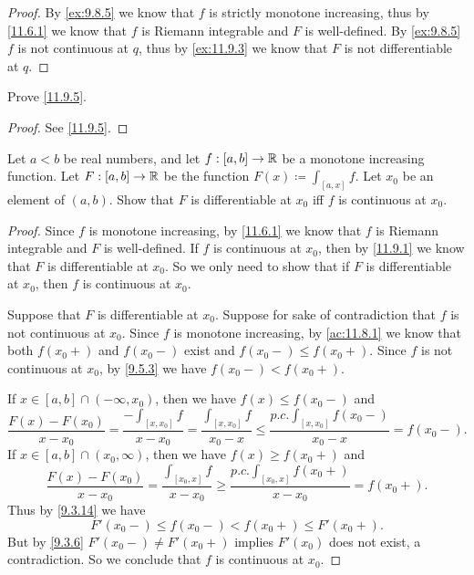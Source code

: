 \begin{proof}
  By \cref{ex:9.8.5} we know that \(f\) is strictly monotone increasing, thus by \cref{11.6.1} we know that \(f\) is Riemann integrable and \(F\) is well-defined.
  By \cref{ex:9.8.5} \(f\) is not continuous at \(q\), thus by \cref{ex:11.9.3} we know that \(F\) is not differentiable at \(q\).
\end{proof}

\begin{ex}\label{ex:11.9.2}
  Prove \cref{11.9.5}.
\end{ex}

\begin{proof}
  See \cref{11.9.5}.
\end{proof}

\begin{ex}\label{ex:11.9.3}
  Let \(a < b\) be real numbers, and let \(f : [a, b] \to \mathbb{R}\) be a monotone increasing function.
  Let \(F : [a, b] \to \mathbb{R}\) be the function \(F(x) \coloneqq \int_{[a, x]} f\).
  Let \(x_0\) be an element of \((a, b)\).
  Show that \(F\) is differentiable at \(x_0\) iff \(f\) is continuous at \(x_0\).
\end{ex}

\begin{proof}
  Since \(f\) is monotone increasing, by \cref{11.6.1} we know that \(f\) is Riemann integrable and \(F\) is well-defined.
  If \(f\) is continuous at \(x_0\), then by \cref{11.9.1} we know that \(F\) is differentiable at \(x_0\).
  So we only need to show that if \(F\) is differentiable at \(x_0\), then \(f\) is continuous at \(x_0\).

  Suppose that \(F\) is differentiable at \(x_0\).
  Suppose for sake of contradiction that \(f\) is not continuous at \(x_0\).
  Since \(f\) is monotone increasing, by \cref{ac:11.8.1} we know that both \(f(x_0+)\) and \(f(x_0-)\) exist and \(f(x_0-) \leq f(x_0+)\).
  Since \(f\) is not continuous at \(x_0\), by \cref{9.5.3} we have \(f(x_0-) < f(x_0+)\).

  If \(x \in [a, b] \cap (-\infty, x_0)\), then we have \(f(x) \leq f(x_0-)\) and
  \[
    \dfrac{F(x) - F(x_0)}{x - x_0} = \dfrac{-\int_{[x, x_0]} f}{x - x_0} = \dfrac{\int_{[x, x_0]} f}{x_0 - x} \leq \dfrac{p.c. \int_{[x, x_0]} f(x_0-)}{x_0 - x} = f(x_0-).
  \]
  If \(x \in [a, b] \cap (x_0, \infty)\), then we have \(f(x) \geq f(x_0+)\) and
  \[
    \dfrac{F(x) - F(x_0)}{x - x_0} = \dfrac{\int_{[x_0, x]} f}{x - x_0} \geq \dfrac{p.c. \int_{[x_0, x]} f(x_0+)}{x - x_0} = f(x_0+).
  \]
  Thus by \cref{9.3.14} we have
  \[
    F'(x_0-) \leq f(x_0-) < f(x_0+) \leq F'(x_0+).
  \]
  But by \cref{9.3.6} \(F'(x_0-) \neq F'(x_0+)\) implies \(F'(x_0)\) does not exist, a contradiction.
  So we conclude that \(f\) is continuous at \(x_0\).
\end{proof}
